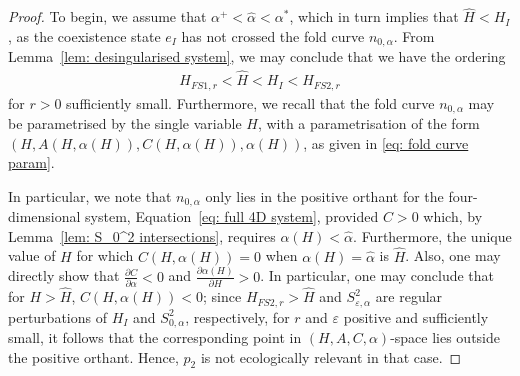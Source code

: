 \documentclass{article}
\theoremstyle{definition}
\numberwithin{equation}{section}
\begin{document}
\begin{proof}
 To begin, we assume that $\alpha^{+}<\hat\alpha<\alpha^\ast$, which in turn implies that $\hat{H}<H_I$, as the coexistence state $e_I$ has not crossed the fold curve $n_{0,\alpha}$. From Lemma~\ref{lem: desingularised system}, we may conclude that we have the ordering
 \begin{align*}
     H_{FS1,r}<\hat{H}<H_I<H_{FS2,r}
 \end{align*}
for $r>0$ sufficiently small.
Furthermore, we recall that the fold curve $n_{0,\alpha}$ may be parametrised by the single variable $H$, with a parametrisation of the form $(H,A(H,\alpha(H)),C(H,\alpha(H)),\alpha(H))$, as given in \eqref{eq: fold curve param}.
 
In particular, we note that $n_{0,\alpha}$ only lies in the positive orthant for the four-dimensional system, Equation~\eqref{eq: full 4D system}, provided $C>0$ which, by Lemma~\ref{lem: S_0^2 intersections}, requires $\alpha(H)<\hat{\alpha}$. Furthermore, the unique value of $H$ for which $C(H,\alpha(H))=0$ when $\alpha(H)=\hat\alpha$ is $\hat{H}$. Also, one may directly show that $\frac{\partial C}{\partial \alpha}<0$ and $\frac{\partial \alpha(H)}{\partial H}>0$. In particular, one may conclude that for $H>\hat{H}$, $C(H,\alpha(H))<0$; since $H_{FS2,r}>\hat{H}$ and $S_{\varepsilon,\alpha}^2$ are regular perturbations of $H_I$ and $S_{0,\alpha}^2$, respectively, for $r$ and $\varepsilon$ positive and sufficiently small, it follows that the corresponding point in $(H,A,C,\alpha)$-space lies outside the positive orthant. Hence, $p_2$ is not ecologically relevant in that case.


\end{proof}
\end{document}
